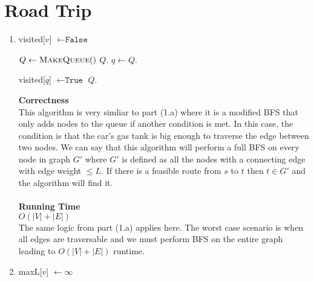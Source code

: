 \documentclass{article}
\begin{document}
\section{Road Trip}
\begin{enumerate}
    \item 
        \begin{algorithmic}
                    \State visited[$v$] $\gets \texttt{False}$
                \EndFor

                \State $Q \gets \Call{MakeQueue}{\null}$ 
                \State $Q.$
                    \State $q \gets Q.$
                    \EndIf

                    \State visited[$q$] $\gets \texttt{True}$
                            \State $Q.$
                        \EndIf
                    \EndFor
                \EndWhile

            \EndFunction
        \end{algorithmic}

        \textbf{Correctness} \\
        This algorithm is very simliar to part (1.a) where it is a modified BFS that only adds nodes to the queue if another condition is met.
        In this case, the condition is that the car's gas tank is big enough to traverse the edge between two nodes. We can say that this algorithm will perform a full
        BFS on every node in graph $G'$ where $G'$ is defined as all the nodes with a connecting edge with edge weight $\leq L$. If there is a feasible route from $s$ to $t$ then
        $t \in G'$ and the algorithm will find it.   \\\\
        \textbf{Running Time} \\
        $O(|V| + |E|)$ \\
        The same logic from part (1.a) applies here. The worst case scenario is when all edges are traversable and we must perform BFS on the entire graph leading to $O(|V| + |E|)$ runtime.

        \item 
            \begin{algorithmic}
                        \State maxL[$v$] $\gets \infty$
                    \EndFor
                

\end{algorithmic}
\end{enumerate}
\end{document}
